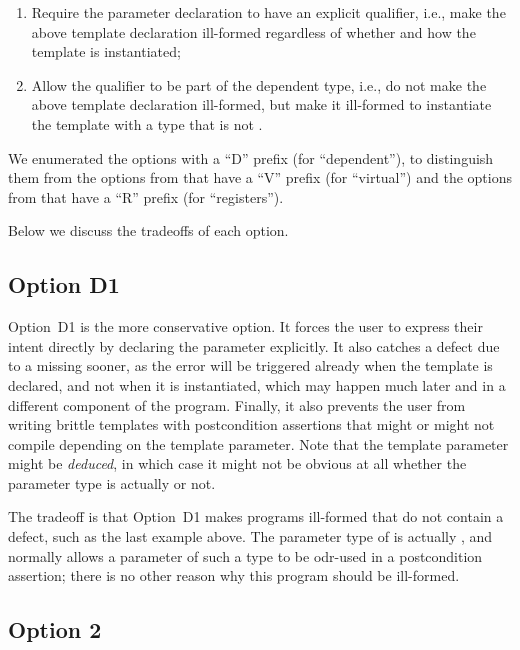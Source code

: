 \begin{enumerate}
\item Require the parameter declaration to have an explicit  qualifier, i.e., make the above template declaration ill-formed regardless of whether and how the template is instantiated;
\item Allow the  qualifier to be part of the dependent type, i.e., do not make the above template declaration ill-formed, but make it ill-formed to instantiate the template with a type that is not .
\end{enumerate}

We enumerated the options with a ``D'' prefix (for ``dependent''), to distinguish them from the options from \cite{D3484R1} that have a ``V'' prefix (for ``virtual'') and the options from \cite{D3487R0} that have a ``R'' prefix (for ``registers'').

Below we discuss the tradeoffs of each option.

\subsection*{Option D1}

Option~D1 is the more conservative option. It forces the user to express their intent directly by  declaring the parameter  explicitly. It also catches a defect due to a missing  sooner, as the error will be triggered already when the template is declared, and not when it is instantiated, which may happen much later and in a different component of the program. Finally, it also prevents the user from writing brittle templates with postcondition assertions that might or might not compile depending on the template parameter. Note that the template parameter might be \emph{deduced}, in which case it might not be obvious at all whether the parameter type is actually  or not.

The tradeoff is that Option~D1 makes programs ill-formed that do not contain a defect, such as the last example above. The parameter type of  is actually , and \cite{P2900R10} normally allows a parameter of such a type to be odr-used in a postcondition assertion; there is no other reason why this program should be ill-formed.

\subsection*{Option 2}

